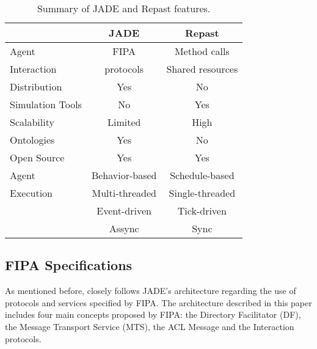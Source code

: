 \begin{table}[h]
	\normalsize
	\caption{Summary of JADE and Repast features.}
	\label{tab:jadevsrep}
	\begin{center}
		\begin{tabular}{l|cc}
		\hline

		\hline
		\textbf{} & \textbf{JADE} & \textbf{Repast} \\ %
		\hline
			Agent 		& FIPA  	&  Method calls  \\ %
			Interaction	& protocols	&  Shared resources \\
		\hline
			Distribution & Yes & No \\ %
		\hline
			Simulation Tools & No & Yes \\ %
		\hline
			Scalability & Limited & High \\ %
		\hline
			Ontologies & Yes & No \\ %
		\hline
			Open Source & Yes & Yes \\ %
		\hline
			Agent  		& Behavior-based & Schedule-based  \\ %
			Execution	& Multi-threaded & Single-threaded \\ %
						& Event-driven   & Tick-driven 	   \\ %
						& Assync		 & Sync 		   \\ %
		\hline
		\end{tabular}
	\end{center}
\end{table} 

\subsection{FIPA Specifications}

As mentioned before, \apiname{} closely follows JADE's architecture regarding the use of protocols and services specified by FIPA. The architecture described in this paper includes four main concepts proposed by FIPA: the Directory Facilitator (DF), the Message Transport Service (MTS), the ACL Message and the Interaction protocols.


